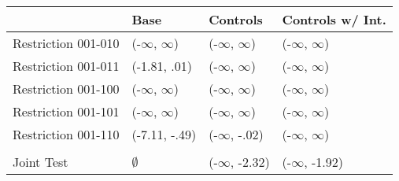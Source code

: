 \begin{tabular}{llll}
\toprule
{} &           Base &      Controls & Controls w/ Int. \\
\midrule
Restriction 001-010 &      (-$\infty$, $\infty$) &     (-$\infty$, $\infty$) &        (-$\infty$, $\infty$) \\
Restriction 001-011 &   (-1.81, .01) &     (-$\infty$, $\infty$) &        (-$\infty$, $\infty$) \\
Restriction 001-100 &      (-$\infty$, $\infty$) &     (-$\infty$, $\infty$) &        (-$\infty$, $\infty$) \\
Restriction 001-101 &      (-$\infty$, $\infty$) &     (-$\infty$, $\infty$) &        (-$\infty$, $\infty$) \\
Restriction 001-110 &  (-7.11, -.49) &   (-$\infty$, -.02) &        (-$\infty$, $\infty$) \\
\hline\\Joint Test  &         $\emptyset$ &  (-$\infty$, -2.32) &     (-$\infty$, -1.92) \\
\bottomrule
\end{tabular}

